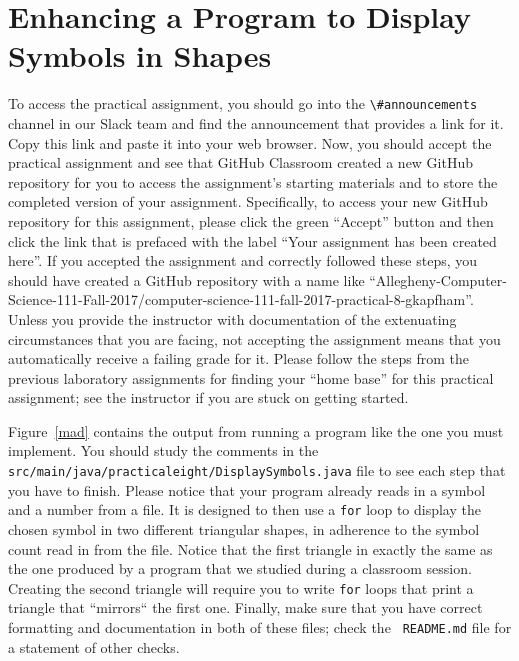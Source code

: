 \documentclass[11pt]{article}
\newcommand{\mainprogramsource}{\lstinline{src/main/java/practicaleight/DisplaySymbols.java}}
\newcommand{\program}[1]{\lstinline{#1}}
\newcommand{\channel}[1]{\lstinline{#1}}
\begin{document}
\section*{Enhancing a Program to Display Symbols in Shapes}

To access the practical assignment, you should go into the \channel{\#announcements} channel in our Slack team and find
the announcement that provides a link for it. Copy this link and paste it into your web browser. Now, you should accept
the practical assignment and see that GitHub Classroom created a new GitHub repository for you to access the
assignment's starting materials and to store the completed version of your assignment. Specifically, to access your new
GitHub repository for this assignment, please click the green ``Accept'' button and then click the link that is prefaced
with the label ``Your assignment has been created here''. If you accepted the assignment and correctly followed these
steps, you should have created a GitHub repository with a name like
``Allegheny-Computer-Science-111-Fall-2017/computer-science-111-fall-2017-practical-8-gkapfham''. Unless you provide the
instructor with documentation of the extenuating circumstances that you are facing, not accepting the assignment means
that you automatically receive a failing grade for it. Please follow the steps from the previous laboratory assignments
for finding your ``home base'' for this practical assignment; see the instructor if you are stuck on getting started.

Figure~\ref{mad} contains the output from running a program like the one you must implement. You should study the
comments in the \mainprogramsource{} file to see each step that you have to finish. Please notice that your program
already reads in a symbol and a number from a file. It is designed to then use a \program{for} loop to display the
chosen symbol in two different triangular shapes, in adherence to the symbol count read in from the file. Notice that
the first triangle in exactly the same as the one produced by a program that we studied during a classroom session.
Creating the second triangle will require you to write \program{for} loops that print a triangle that ``mirrors`` the
first one. Finally, make sure that you have correct formatting and documentation in both of these files; check the {\tt
README.md} file for a statement of other checks.
\end{document}
